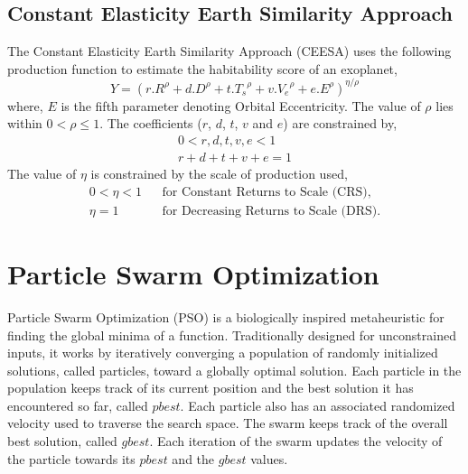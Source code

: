 \documentclass[10pt]{article}
\begin{document}
\subsection{Constant Elasticity Earth Similarity Approach}\label{subsec:ceesa}
The Constant Elasticity Earth Similarity Approach (CEESA) uses the following production function to estimate the
habitability score of an exoplanet,
\begin{equation}\label{eq:ceesa}
  Y = {(r.R^\rho+d.D^\rho+t.{T_s}^\rho+v.{V_e}^\rho+e.E^\rho)}^{\eta/\rho}
\end{equation}
where, $E$ is the fifth parameter denoting Orbital Eccentricity. The value of $\rho$ lies within $0<\rho\leq 1$.
The coefficients ($r$, $d$, $t$, $v$ and $e$) are constrained by,
\begin{subequations}
  \begin{align}
      0 < r,d,t,v,e < 1\\
      r+d+t+v+e = 1
  \end{align}
\end{subequations}
The value of $\eta$ is constrained by the scale of production used,
\begin{subequations}
  \begin{align}
    0 < \eta < 1 && \text{for Constant Returns to Scale (CRS),}\\
    \eta = 1 && \text{for Decreasing Returns to Scale (DRS).}
  \end{align}
\end{subequations}

\section{Particle Swarm Optimization}\label{sec:pso}
Particle Swarm Optimization (PSO) is a biologically inspired metaheuristic for finding the global minima of a function.
Traditionally designed for unconstrained inputs, it works by iteratively converging a population of randomly initialized
solutions, called particles, toward a globally optimal solution. Each particle in the population keeps track of its
current position and the best solution it has encountered so far, called $pbest$. Each particle also has an associated
randomized velocity used to traverse the search space. The swarm keeps track of the overall best solution, called
$gbest$. Each iteration of the swarm updates the velocity of the particle towards its $pbest$ and the $gbest$ values.
\end{document}
